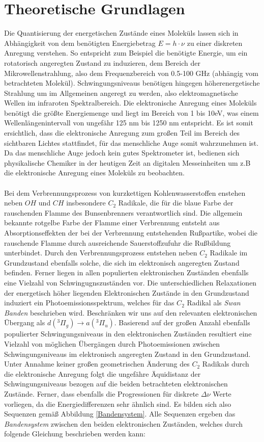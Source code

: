 %
%

\section{Theoretische Grundlagen}
Die Quantisierung der energetischen Zustände eines Moleküls lassen sich in Abhängigkeit von dem benötigten Energiebetrag $E = h \cdot \nu$ zu einer diskreten Anregung verstehen. So entspricht zum Beispiel die benötigte Energie, um ein rotatorisch angeregten Zustand zu induzieren, dem Bereich der Mikrowellenstrahlung, also dem Frequenzbereich von 0.5-100 GHz (abhängig vom betrachteten Molekül). Schwingungsniveaus benötigen hingegen höherenergetische Strahlung um im Allgemeinen angeregt zu werden, also elektromagnetische Wellen im infraroten Spektralbereich. Die elektronische Anregung eines Moleküls benötigt die größte Energiemenge und liegt im Bereich von 1 bis 10eV, was einem Wellenlängenintervall von ungefähr 125 nm bis 1250 nm entspricht. Es ist somit ersichtlich, dass die elektronische Anregung zum großen Teil im Bereich des sichtbaren Lichtes stattfindet, für das menschliche Auge somit wahrzunehmen ist. Da das menschliche Auge jedoch kein gutes Spektrometer ist, bedienen sich physikalische Chemiker in der heutigen Zeit an digitalen Messeinheiten um z.B die elektronische Anregung eines Moleküls zu beobachten.\\
\\
Bei dem Verbrennungsprozess von kurzkettigen Kohlenwasserstoffen enstehen neben $OH$ und $CH$ insbesondere $C_2$ Radikale, die für die blaue Farbe der rauschenden Flamme des Bunsenbrenners verantwortlich sind. Die allgemein bekannte rotgelbe Farbe der Flamme einer Verbrennung entsteht aus Absorptionseffekten der bei der Verbrennung entstehenden Rußpartike, wobei die rauschende Flamme durch ausreichende Sauerstoffzufuhr die Rußbildung unterbindet. Durch den Verbrennungsprozess entstehen neben $C_2$ Radikale im Grundzustand ebenfalls solche, die sich im elektronisch angeregten Zustand befinden. Ferner liegen in allen populierten elektronischen Zuständen ebenfalls eine Vielzahl von Schwingugnszuständen vor. Die unterschiedlichen Relaxationen der energetisch höher liegenden Elektronischen Zustände in den Grundzustand  induziert ein Photoemissionsspektrum, welches für das $C_2$ Radikal als \textit{Swan Banden} beschrieben wird. Beschränken wir uns auf den relevanten elektronischen Übergang als $d(^3\Pi_g) \rightarrow a(^3\Pi_u)$. Basierend auf der großen Anzahl ebenfalls populierter Schwingungsniveaus in den elektronischen Zuständen resultiert eine Vielzahl von möglichen Übergängen durch Photoemissionen zwischen Schwingungsniveaus im elektronisch angeregten Zustand in den Grundzustand. Unter Annahme keiner großen geometrischen Änderung des $C_2$ Radikals durch die elektronische Anregung folgt die ungefähre Äquidistanz der Schwingungsniveaus bezogen auf die beiden betrachteten elektronischen Zustände. Ferner, dass ebenfalls die Progressionen für diskrete $\Delta \nu$ Werte vorliegen, da die Energiedifferenzen sehr ähnlich sind. Es bilden sich also Sequenzen gemäß Abbildung \ref{Bandensystem}. Alle Sequenzen ergeben das \textit{Bandensystem} zwischen den beiden elektronischen Zuständen, welches durch folgende Gleichung beschrieben werden kann: 
